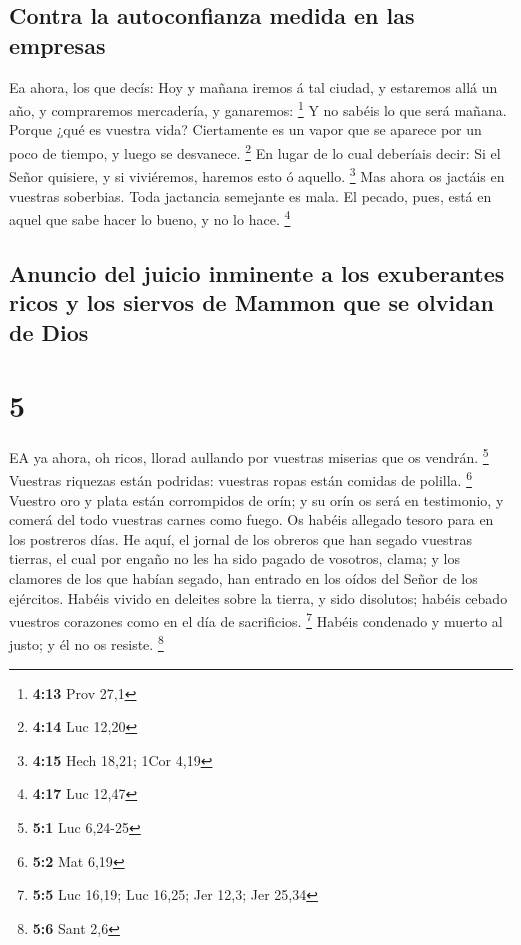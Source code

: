 \hypertarget{contra-la-autoconfianza-medida-en-las-empresas}{%
\subsection{Contra la autoconfianza medida en las
empresas}\label{contra-la-autoconfianza-medida-en-las-empresas}}

 Ea ahora, los que decís: Hoy y mañana iremos á tal ciudad,
y estaremos allá un año, y compraremos mercadería, y ganaremos:
\footnote{\textbf{4:13} Prov 27,1}  Y no sabéis lo que será
mañana. Porque ¿qué es vuestra vida? Ciertamente es un vapor que se
aparece por un poco de tiempo, y luego se desvanece. \footnote{\textbf{4:14}
  Luc 12,20}  En lugar de lo cual deberíais decir: Si el
Señor quisiere, y si viviéremos, haremos esto ó aquello. \footnote{\textbf{4:15}
  Hech 18,21; 1Cor 4,19}  Mas ahora os jactáis en vuestras
soberbias. Toda jactancia semejante es mala.  El pecado,
pues, está en aquel que sabe hacer lo bueno, y no lo hace. \footnote{\textbf{4:17}
  Luc 12,47}

\hypertarget{anuncio-del-juicio-inminente-a-los-exuberantes-ricos-y-los-siervos-de-mammon-que-se-olvidan-de-dios}{%
\subsection{Anuncio del juicio inminente a los exuberantes ricos y los
siervos de Mammon que se olvidan de
Dios}\label{anuncio-del-juicio-inminente-a-los-exuberantes-ricos-y-los-siervos-de-mammon-que-se-olvidan-de-dios}}

\hypertarget{section-4}{%
\section{5}\label{section-4}}

 EA ya ahora, oh ricos, llorad aullando por vuestras
miserias que os vendrán. \footnote{\textbf{5:1} Luc 6,24-25}
 Vuestras riquezas están podridas: vuestras ropas están
comidas de polilla. \footnote{\textbf{5:2} Mat 6,19} 
Vuestro oro y plata están corrompidos de orín; y su orín os será en
testimonio, y comerá del todo vuestras carnes como fuego. Os habéis
allegado tesoro para en los postreros días.  He aquí, el
jornal de los obreros que han segado vuestras tierras, el cual por
engaño no les ha sido pagado de vosotros, clama; y los clamores de los
que habían segado, han entrado en los oídos del Señor de los ejércitos.
 Habéis vivido en deleites sobre la tierra, y sido
disolutos; habéis cebado vuestros corazones como en el día de
sacrificios. \footnote{\textbf{5:5} Luc 16,19; Luc 16,25; Jer 12,3; Jer
  25,34}  Habéis condenado y muerto al justo; y él no os
resiste. \footnote{\textbf{5:6} Sant 2,6}


